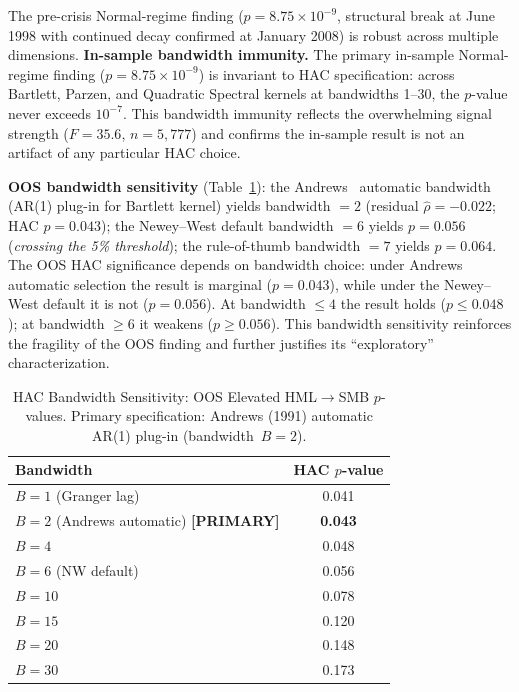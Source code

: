 \documentclass[sigconf,anonymous]{acmart}
\begin{document}
The pre-crisis Normal-regime finding ($p = 8.75 \times 10^{-9}$, structural
break at June 1998 with continued decay confirmed at January 2008) is robust across multiple dimensions.
\textbf{In-sample bandwidth immunity.}
The primary in-sample Normal-regime finding ($p = 8.75 \times 10^{-9}$)
is invariant to HAC specification: across Bartlett, Parzen, and
Quadratic Spectral kernels at bandwidths 1--30, the $p$-value never
exceeds $10^{-7}$. This bandwidth immunity reflects the overwhelming
signal strength ($F = 35.6$, $n = 5{,}777$) and confirms the
in-sample result is not an artifact of any particular HAC choice.

\textbf{OOS bandwidth sensitivity} (Table~\ref{tab:bandwidth_sensitivity}):
the Andrews~\cite{andrews1991heteroskedasticity} automatic bandwidth
(AR(1) plug-in for Bartlett kernel) yields bandwidth $= 2$
(residual $\hat{\rho} = -0.022$; HAC $p = 0.043$);
the Newey--West default bandwidth $= 6$ yields $p = 0.056$
(\emph{crossing the 5\% threshold}); the rule-of-thumb bandwidth $= 7$
yields $p = 0.064$.
The OOS HAC significance depends on bandwidth choice:
under Andrews automatic selection the result is marginal ($p = 0.043$),
while under the Newey--West default it is not ($p = 0.056$).
At bandwidth $\leq 4$ the result holds ($p \leq 0.048$); at bandwidth
$\geq 6$ it weakens ($p \geq 0.056$). This bandwidth sensitivity
reinforces the fragility of the OOS finding and further justifies its
``exploratory'' characterization.

\begin{table}[t]
\centering
\caption{HAC Bandwidth Sensitivity: OOS Elevated HML$\to$SMB $p$-values.
Primary specification: Andrews (1991) automatic AR(1) plug-in (bandwidth~$B = 2$).}
\label{tab:bandwidth_sensitivity}
\small
\begin{tabular}{@{}lc@{}}
\toprule
Bandwidth & HAC $p$-value \\
\midrule
$B = 1$ (Granger lag) & 0.041 \\
$B = 2$ (Andrews automatic) \textbf{[PRIMARY]} & \textbf{0.043} \\
$B = 4$ & 0.048 \\
$B = 6$ (NW default) & 0.056 \\
$B = 10$ & 0.078 \\
$B = 15$ & 0.120 \\
$B = 20$ & 0.148 \\
$B = 30$ & 0.173 \\
\bottomrule
\end{tabular}
\end{table}
\end{document}
